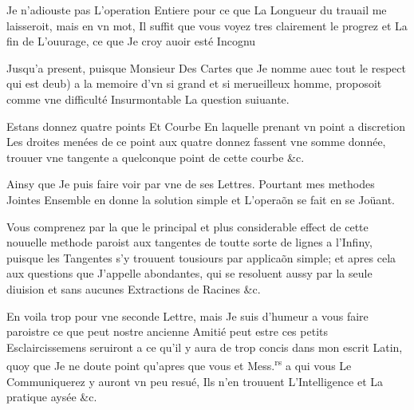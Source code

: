 \documentclass[11pt,a4paper]{article}
\begin{document}
Je n'adiouste pas L'operation Entiere pour ce que La Longueur du trauail me laisseroit, mais en vn mot, Il suffit que vous voyez tres clairement le progrez et La fin de L'ouurage, ce que Je croy auoir esté Incognu


Jusqu'a present, puisque Monsieur Des Cartes que Je nomme auec tout le respect qui est deub) a la memoire d'vn si grand  et si merueilleux homme, proposoit comme vne difficulté Insurmontable La question suiuante.

Estans donnez quatre points Et Courbe En laquelle prenant vn point a discretion Les droites menées de ce point aux quatre donnez fassent vne somme donnée, trouuer vne tangente a quelconque point de cette courbe \&c.

Ainsy que Je puis faire voir par vne de ses Lettres. Pourtant mes methodes Jointes Ensemble en donne la solution simple et L'operaõn se fait en se Joüant.

Vous comprenez par la que le principal et plus considerable effect de cette nouuelle methode paroist aux tangentes de toutte sorte de lignes a l'Infiny, puisque les Tangentes s'y trouuent tousiours par applicaõn simple; et apres cela aux questions que J'appelle abondantes, qui se resoluent aussy par la seule diuision et sans aucunes Extractions de Racines \&c.

En voila trop pour vne seconde Lettre, mais Je suis d'humeur a vous faire paroistre ce que peut nostre ancienne Amitié peut estre ces petits Esclaircissemens seruiront a ce qu'il y aura de trop concis dans mon escrit Latin, quoy que Je ne doute point qu'apres que vous et Mess.\textsuperscript{rs} a qui vous Le Communiquerez y auront vn peu resué, Ils n'en trouuent L'Intelligence et La pratique aysée \&c.
\end{document}
